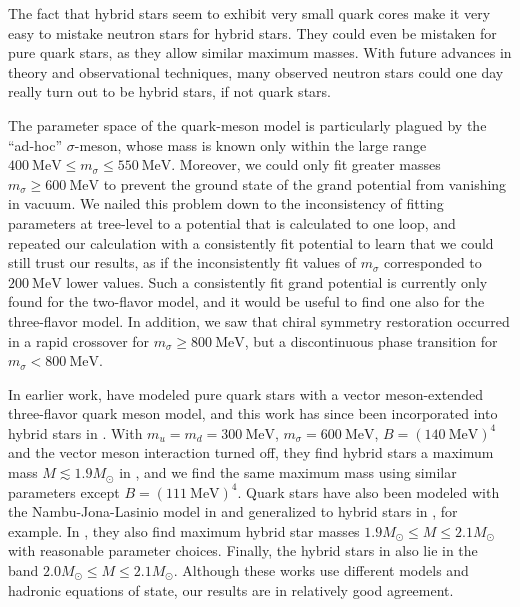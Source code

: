 The fact that hybrid stars seem to exhibit very small quark cores
make it very easy to mistake neutron stars for hybrid stars.
They could even be mistaken for pure quark stars, as they allow similar maximum masses.
With future advances in theory and observational techniques,
many observed neutron stars could one day really turn out to be hybrid stars, if not quark stars.

The parameter space of the quark-meson model is particularly plagued by the ``ad-hoc'' $\sigma$-meson,
whose mass is known only within the large range $\SI{400}{\mega\electronvolt} \leq m_\sigma \leq \SI{550}{\mega\electronvolt}$.
Moreover, we could only fit greater masses $m_\sigma \geq \SI{600}{\mega\electronvolt}$ to prevent the ground state of the grand potential from vanishing in vacuum.
We nailed this problem down to the inconsistency of fitting parameters at tree-level to a potential that is calculated to one loop,
and repeated our calculation with a consistently fit potential to learn that we could still trust our results,
as if the inconsistently fit values of $m_\sigma$ corresponded to $\SI{200}{\mega\electronvolt}$ lower values.
Such a consistently fit grand potential is currently only found for the two-flavor model, and it would be useful to find one also for the three-flavor model.
In addition, we saw that chiral symmetry restoration occurred in a rapid crossover for $m_\sigma \geq \SI{800}{\mega\electronvolt}$,
but a discontinuous phase transition for $m_\sigma < \SI{800}{\mega\electronvolt}$.

In earlier work, \cite{ref:lsm3f_compact_stars} have modeled pure quark stars with a vector meson-extended three-flavor quark meson model,
and this work has since been incorporated into hybrid stars in \cite{ref:lsm3f_hybrid_stars}.
With $m_u = m_d = \SI{300}{\mega\electronvolt}$, $m_\sigma = \SI{600}{\mega\electronvolt}$, $B = (\SI{140}{\mega\electronvolt})^4$ and the vector meson interaction turned off,
they find hybrid stars a maximum mass $M \lesssim 1.9 M_\odot$ in \cite[figure 8]{ref:lsm3f_hybrid_stars}, %
and we find the same maximum mass using similar parameters except $B = (\SI{111}{\mega\electronvolt})^4$.
Quark stars have also been modeled with the Nambu-Jona-Lasinio model in \cite{ref:quark_star_njl} and generalized to hybrid stars in \cite{ref:hybrid_stars_njl}, for example.
In \cite[figure 3]{ref:hybrid_stars_njl}, they also find maximum hybrid star masses $1.9 M_\odot \leq M \leq 2.1 M_\odot$ with reasonable parameter choices.
Finally, the hybrid stars in \cite{ref:quark_hybrid_additional_ref} also lie in the band $2.0 M_\odot \leq M \leq 2.1 M_\odot$.
Although these works use different models and hadronic equations of state,
our results are in relatively good agreement.


